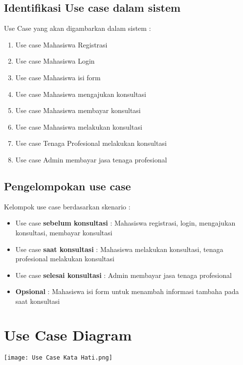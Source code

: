 \documentclass{article}
\begin{document}
	\subsection{Identifikasi Use case dalam sistem}
	Use Case yang akan digambarkan dalam sistem :
	\begin{enumerate}
		\item Use case Mahasiswa Registrasi
		\item Use case Mahasiswa Login
		\item Use case Mahasiswa isi form
		\item Use case Mahasiswa mengajukan konsultasi
		\item Use case Mahasiswa membayar konsultasi
		\item Use case Mahasiswa melakukan konsultasi
		\item Use case Tenaga Profesional melakukan konsultasi
		\item Use case Admin membayar jasa tenaga profesional
	\end{enumerate}
	\subsection{Pengelompokan use case}
	Kelompok use case berdasarkan skenario :
	\begin{itemize}
		\item Use case \textbf{sebelum konsultasi} :  Mahasiswa registrasi, login, mengajukan konsultasi, membayar konsultasi
		\item Use case \textbf{saat konsultasi} :  Mahasiswa melakukan konsultasi, tenaga profesional melakukan konsultasi
		\item Use case \textbf{selesai konsultasi} :  Admin membayar jasa tenaga profesional
		\item \textbf{Opsional} : Mahasiswa isi form untuk menambah informasi tambaha pada saat konsultasi
	\end{itemize}
	
	\newpage
	\section{Use Case Diagram}
	\centering
	\texttt{[image: Use Case Kata Hati.png]}
	\par
	
	
\end{document}
